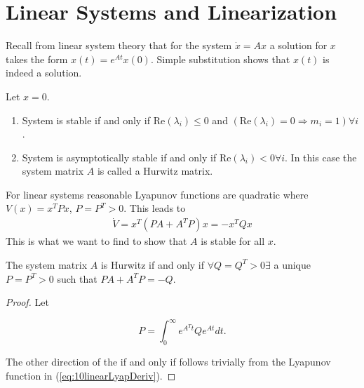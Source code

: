 \section{Linear Systems and Linearization}
Recall from linear system theory that for the system $\dot{x}=Ax$ a solution for $x$ takes the form $x(t)=e^{At}x(0)$.
Simple substitution shows that $x(t)$ is indeed a solution.

\begin{theorem}
Let $x=0$.
\begin{enumerate}
\item System is stable if and only if $\text{Re}(\lambda_i)\leq0$ and $(\text{Re}(\lambda_i)=0\Rightarrow m_i=1)\forall i$.
\item System is asymptotically stable if and only if $\text{Re}(\lambda_i)<0 \forall i$.
In this case the system matrix $A$ is called a Hurwitz matrix.
\end{enumerate}
\end{theorem}

For linear systems reasonable Lyapunov functions are quadratic where $V(x)=x^T Px$, $P=P^T>0$.
This leads to
\begin{align}
\label{eq:10linearLyapDeriv}
\dot{V} = x^T(PA+A^T P)x = -x^T Qx
\end{align}
This is what we want to find to show that $A$ is stable for all $x$.

\begin{theorem}
The system matrix $A$ is Hurwitz if and only if $\forall Q=Q^T>0\exists$ a unique $P=P^T>0$ such that $PA+A^T P = -Q$.
\end{theorem}

\begin{proof}
Let

\begin{equation*}
P=\int_0^\infty e^{A^T t}Qe^{At}dt.
\end{equation*}

The other direction of the if and only if follows trivially from the Lyapunov function in (\ref{eq:10linearLyapDeriv}).
\end{proof}

